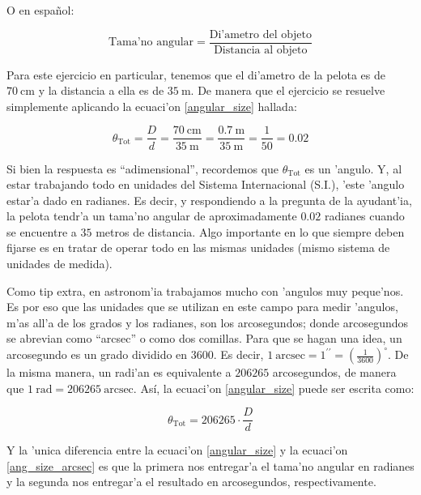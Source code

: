 \documentclass{article}
\begin{document}
\begin{enumerate} [a)]
O en español:

\begin{equation} \label{palabras}
\text{Tama{'n}o angular} = \frac{\text{Di'ametro del objeto}}{\text{Distancia al objeto}}
\end{equation}

Para este ejercicio en particular, tenemos que el di'ametro de la pelota es de $70 \ \text{cm}$ y la distancia a ella es de $35 \ \text{m}$. De manera que el ejercicio se resuelve simplemente aplicando la ecuaci'on \eqref{angular_size} hallada:

\begin{equation*}
\theta_{\text{Tot}} = \frac{D}{d} = \frac{70 \ \text{cm}}{35 \ \text{m}} = \frac{0.7 \ \text{m}}{35 \ \text{m}} = \frac{1}{50} = 0.02
\end{equation*}


Si bien la respuesta es ``adimensional'', recordemos que $\theta_{\text{Tot}}$ es un 'angulo. Y, al estar trabajando todo en unidades del Sistema Internacional (S.I.), 'este 'angulo estar'a dado en radianes.
Es decir, y respondiendo a la pregunta de la ayudant'ia, la pelota tendr'a un tama'no angular de aproximadamente $0.02$ radianes cuando se encuentre a $35$ metros de distancia. Algo importante en lo que siempre deben fijarse es en tratar de operar todo en las mismas unidades (mismo sistema de unidades de medida). 

Como tip extra, en astronom'ia trabajamos mucho con 'angulos muy peque'nos. Es por eso que las unidades que se utilizan en este campo para medir 'angulos, m'as all'a de los grados y los radianes, son los arcosegundos; donde arcosegundos se abrevian como ``arcsec'' o como dos comillas. Para que se hagan una idea, un arcosegundo es un grado dividido en 3600. Es decir, $1 \ \text{arcsec} = 1^{\prime \prime} = (\frac{1}{3600})^\circ$. De la misma manera, un radi'an es equivalente a $206265$ arcosegundos, de manera que $1 \ \text{rad} = 206265 \ \text{arcsec}$. Así, la ecuaci'on \eqref{angular_size} puede ser escrita como:

\begin{equation}\label{ang_size_arcsec}
\theta_{\text{Tot}} = 206265 \cdot \frac{D}{d}
\end{equation}

Y la 'unica diferencia entre la ecuaci'on \eqref{angular_size} y la ecuaci'on \eqref{ang_size_arcsec} es que la primera nos entregar'a el tama'no angular en radianes y la segunda nos entregar'a el resultado en arcosegundos, respectivamente.


\end{enumerate}
\end{document}
